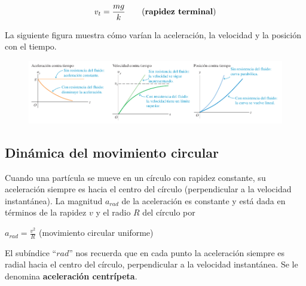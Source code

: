 \documentclass{article}
\newcommand{\newsubsection}[1]{
    \subsection{\color{sectionColor} #1}
}
\newcommand{\bl}[1]{\textbf{#1}}
\newcommand{\definicion}[1]{%
    \vspace{0.5cm}
    \begin{definicionbox}
        #1
    \end{definicionbox}
    \vspace{0.5cm}
}
\begin{document}
    \[ v_t = \frac{mg}{k} \quad \quad \text{(\bl{rapidez terminal})} \]

    \par La siguiente figura muestra cómo varían la aceleración, la velocidad y la posición con el tiempo.

    \begin{figure}[H]
        \centering
        \includegraphics[width=\textwidth]{img/3.3-7.png}
    \end{figure}

    \newsubsection{Dinámica del movimiento circular}

    \par Cuando una partícula se mueve en un círculo con rapidez constante, su aceleración siempre es hacia el centro del círculo (perpendicular a la velocidad instantánea). La magnitud $a_{rad}$ de la aceleración es constante y está dada en términos de la rapidez $v$ y el radio $R$ del círculo por

    \definicion{
        \centering
        \( a_{rad} = \frac{v^2}{R} \) \quad \quad (movimiento circular uniforme)
    }

    \par El subíndice “$rad$” nos recuerda que en cada punto la aceleración siempre es radial hacia el centro del círculo, perpendicular a la velocidad instantánea. Se le denomina \bl{aceleración centrípeta}.

    \vspace{0.5cm}
\end{document}
